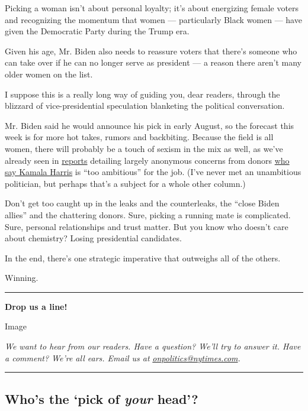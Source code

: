 Picking a woman isn't about personal loyalty; it's about energizing
female voters and recognizing the momentum that women --- particularly
Black women --- have given the Democratic Party during the Trump era.

Given his age, Mr. Biden also needs to reassure voters that there's
someone who can take over if he can no longer serve as president --- a
reason there aren't many older women on the list.

I suppose this is a really long way of guiding you, dear readers,
through the blizzard of vice-presidential speculation blanketing the
political conversation.

Mr. Biden said he would announce his pick in early August, so the
forecast this week is for more hot takes, rumors and backbiting. Because
the field is all women, there will probably be a touch of sexism in the
mix as well, as we've already seen in
\href{https://www.politico.com/news/2020/07/27/kamala-harris-biden-vp-381829}{reports}
detailing largely anonymous concerns from donors
\href{https://twitter.com/feliciasonmez/status/1288587415813345282}{who
say Kamala Harris} is ``too ambitious'' for the job. (I've never met an
unambitious politician, but perhaps that's a subject for a whole other
column.)

Don't get too caught up in the leaks and the counterleaks, the ``close
Biden allies'' and the chattering donors. Sure, picking a running mate
is complicated. Sure, personal relationships and trust matter. But you
know who doesn't care about chemistry? Losing presidential candidates.

In the end, there's one strategic imperative that outweighs all of the
others.

Winning.

\begin{center}\rule{0.5\linewidth}{\linethickness}\end{center}

\textbf{Drop us a line!}

Image

\emph{We want to hear from our readers. Have a question? We'll try to
answer it. Have a comment? We're all ears. Email us at}
\href{mailto:onpolitics@nytimes.com}{\emph{onpolitics@nytimes.com}}\emph{.}

\begin{center}\rule{0.5\linewidth}{\linethickness}\end{center}

\hypertarget{whos-the-pick-of-your-head}{%
\subsection{\texorpdfstring{Who's the `pick of \emph{your}
head'?}{Who's the `pick of your head'?}}\label{whos-the-pick-of-your-head}}

